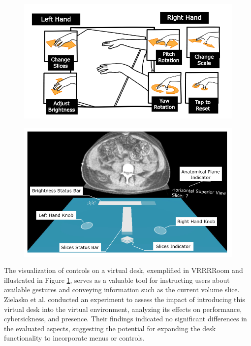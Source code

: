     \begin{figure}[h!]
        \centering
        \begin{minipage}[t]{.45\textwidth}
          \centering
          \includegraphics[width=1\textwidth]{figures/vroom_gesture.png}
          \label{fig:vroom_gesture}
        \end{minipage}%
        \hspace{0.05\textwidth}
        \begin{minipage}[t]{.45\textwidth}
          \centering
          \includegraphics[width=1\textwidth]{figures/vroom_desk.png}
          \label{fig:vroom_desk}
        \end{minipage}
    \end{figure}

    The visualization of controls on a virtual desk, exemplified in VRRRRoom \cite{sousaVRRRRoomVirtualReality2017} and illustrated in Figure \ref{fig:vroom_desk}, serves as a valuable tool for instructing users about available gestures and conveying information such as the current volume slice. Zielasko et al. \cite{zielaskoNonStationaryOfficeDesk2019} conducted an experiment to assess the impact of introducing this virtual desk into the virtual environment, analyzing its effects on performance, cybersickness, and presence. Their findings indicated no significant differences in the evaluated aspects, suggesting the potential for expanding the desk functionality to incorporate menus or controls.

